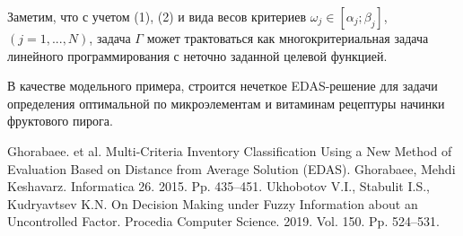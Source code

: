 Заметим, что с учетом (1), (2) и вида весов критериев $\omega_{j} \in [\alpha_{j};\beta_{j}]$, $(j=1, ..., N)$, задача $\varGamma$ может трактоваться как 
многокритериальная задача линейного программирования с неточно заданной целевой функцией.

В качестве модельного примера, строится нечеткое EDAS-решение для задачи определения оптимальной по микроэлементам и витаминам рецептуры начинки фруктового пирога.


\begin{thebibliography}{9} %
 Ghorabaee. et al. Multi-Criteria Inventory Classification Using a New Method of Evaluation Based on Distance from Average Solution (EDAS). Ghorabaee, Mehdi Keshavarz. Informatica 26. 2015. Pp. 435--451.
 Ukhobotov V.I., Stabulit I.S., Kudryavtsev K.N. On Decision Making under Fuzzy Information about an Uncontrolled Factor. Procedia Computer Science.  2019. Vol. 150. Pp. 524--531.

\end{thebibliography}





%

